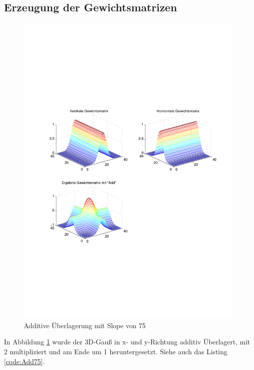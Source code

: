 \subsection{Erzeugung der Gewichtsmatrizen} \label{eGew}
\begin{figure}[hbt]
	\centering
	\includegraphics[width=\linewidth, keepaspectratio]{./Bilder/Auswertung/GewichtmatrixEinzelschritte/Endergebnis_Gewichtsmatrix_Slope_75_Type_Add}
	\caption{Additive Überlagerung mit Slope von 75}
	\label{Add75}
\end{figure}


 \label{code:Add75}

In Abbildung \ref{Add75} wurde der 3D-Gauß in x- und y-Richtung additiv Überlagert, mit 2 multipliziert und am Ende um 1 heruntergesetzt. Siehe auch das Listing \ref{code:Add75}.

